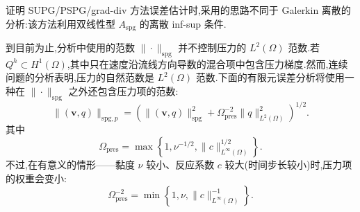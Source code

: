 \begin{note}\label{note:oseen-spg-pressure-error-norm-approach}
\textcite{TobiskaVerfuerth1996}证明 SUPG/PSPG/grad-div 方法误差估计时,采用的思路不同于 Galerkin 离散的分析:该方法利用双线性型 $A_{\mathrm{spg}}$ 的离散 inf-sup 条件.

到目前为止,分析中使用的范数 $\|\cdot\|_{\mathrm{spg}}$ 并不控制压力的 $L^2(\Omega)$ 范数.若 $Q^h\subset H^1(\Omega)$,其中只在速度沿流线方向导数的混合项中包含压力梯度.然而,连续问题的分析表明,压力的自然范数是 $L^2(\Omega)$ 范数.下面的有限元误差分析将使用一种在 $\|\cdot\|_{\mathrm{spg}}$ 之外还包含压力项的范数:
\begin{equation}\label{eq:oseen-spg-pressure-norm}
 \|(\bm{v},q)\|_{\mathrm{spg},p}
  =\left(\|(\bm{v},q)\|_{\mathrm{spg}}^2
          +\Omega_{\mathrm{pres}}^{-2}
             \|q\|_{L^2(\Omega)}^2\right)^{1/2}.
\end{equation}
其中
\begin{equation}\label{eq:oseen-spg-pressure-weight}
 \Omega_{\mathrm{pres}}
  =\max\left\{1,\nu^{-1/2},
                  \|c\|_{L^\infty(\Omega)}^{1/2}\right\}.
\end{equation}
不过,在有意义的情形——黏度 $\nu$ 较小、反应系数 $c$ 较大(时间步长较小)时,压力项的权重会变小:
\[
 \Omega_{\mathrm{pres}}^{-2}
   =\min\left\{1,\nu,
                    \|c\|_{L^\infty(\Omega)}^{-1}\right\}.
\]
\end{note}


